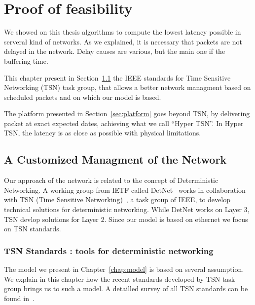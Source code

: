
\chapter{Proof of feasibility}
\label{chap:TSN}
\minitoc

We showed on this thesis algorithms to compute the lowest latency possible in serveral kind of networks. As we explained, it is necessary that packets are not delayed in the network. Delay causes are various, but the main one if the buffering time. 

This chapter present in Section~\ref{sec:TSNqbv} the IEEE standards for Time Sensitive Networking (TSN) task group, that allows a better network managment based on scheduled packets and on which our model is based.

The platform presented in Section~\ref{sec:platform} goes beyond TSN, by delivering packet at exact expected dates, achieving what we call “Hyper TSN”. In Hyper TSN, the latency is as close as possible with physical limitations.


\section{A Customized Managment of the Network}
\label{sec:TSNqbv}

Our approach of the network is related to the concept of Deterministic Networking. A working group from IETF called DetNet~\cite{finn-detnet-architecture-08} works in collaboration with TSN (Time Sensitive Networking)~\cite{ieee802}, a task group of IEEE, to develop technical solutions for deterministic networking. While DetNet works on Layer 3, TSN devlop solutions for Layer 2. Since our model is based on ethernet we focus on TSN standards.

\subsection{TSN Standards : tools for deterministic networking}
The model we present in Chapter~\ref{chap:model} is based on several assumption. We explain in this chapter how the recent standards developed by TSN task group brings us to such a model. A detailled survey of all TSN standards can be found in~\cite{8458130}. 


